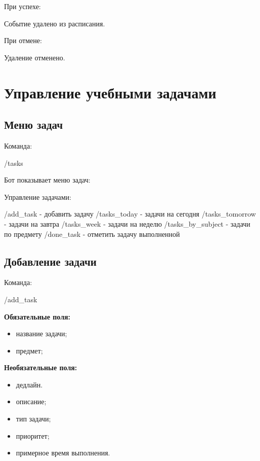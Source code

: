 \documentclass[10pt,a4paper,final]{article} %
\begin{document}
При успехе:

\begin{Code}
Событие удалено из расписания.
\end{Code}

При отмене:

\begin{Code}
Удаление отменено.
\end{Code}

\section{Управление учебными задачами}

\subsection{Меню задач}

Команда:

\begin{Code}
/tasks
\end{Code}

Бот показывает меню задач:

\begin{Code}
Управление задачами:

/add_task - добавить задачу
/tasks_today - задачи на сегодня
/tasks_tomorrow - задачи на завтра
/tasks_week - задачи на неделю
/tasks_by_subject - задачи по предмету
/done_task - отметить задачу выполненной
\end{Code}

\subsection{Добавление задачи}

Команда:

\begin{Code}
/add_task
\end{Code}

\textbf{Обязательные поля:}

\begin{itemize}
    \item название задачи;
    \item предмет;

\end{itemize}

\textbf{Необязательные поля:}

\begin{itemize}
\item дедлайн.
    \item описание;
    \item тип задачи;
    \item приоритет;
    \item примерное время выполнения.
\end{itemize}
\end{document}
